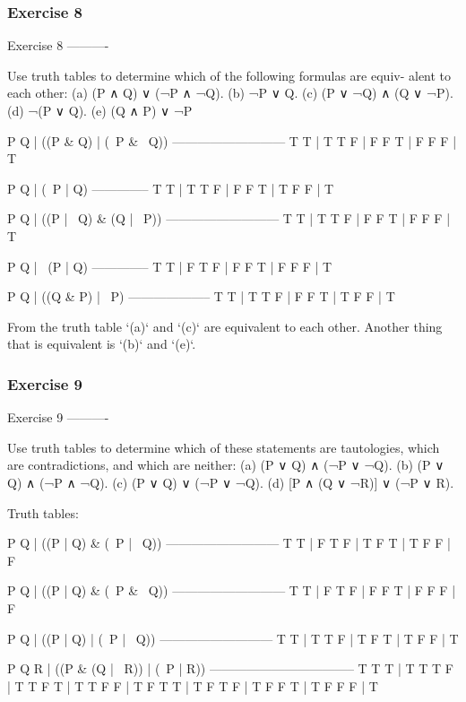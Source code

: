 \subsubsection{Exercise 8}
Exercise 8
----------

    Use truth tables to determine which of the following formulas are equiv-
    alent to each other:
    (a) (P ∧ Q) ∨ (¬P ∧ ¬Q).
    (b) ¬P ∨ Q.
    (c) (P ∨ ¬Q) ∧ (Q ∨ ¬P).
    (d) ¬(P ∨ Q).
    (e) (Q ∧ P) ∨ ¬P

    P Q | ((P & Q) | (~P & ~Q))
    ---------------------------
    T T | T
    T F | F
    F T | F
    F F | T

    P Q | (~P | Q)
    --------------
    T T | T
    T F | F
    F T | T
    F F | T

    P Q | ((P | ~Q) & (Q | ~P))
    ---------------------------
    T T | T
    T F | F
    F T | F
    F F | T

    P Q | ~(P | Q)
    --------------
    T T | F
    T F | F
    F T | F
    F F | T

    P Q | ((Q & P) | ~P)
    --------------------
    T T | T
    T F | F
    F T | T
    F F | T

From the truth table `(a)` and `(c)` are equivalent to each other.
Another thing that is equivalent is `(b)` and `(e)`.

\subsubsection{Exercise 9}
Exercise 9
----------

    Use truth tables to determine which of these statements are tautologies,
    which are contradictions, and which are neither:
    (a) (P ∨ Q) ∧ (¬P ∨ ¬Q).
    (b) (P ∨ Q) ∧ (¬P ∧ ¬Q).
    (c) (P ∨ Q) ∨ (¬P ∨ ¬Q).
    (d) [P ∧ (Q ∨ ¬R)] ∨ (¬P ∨ R).

Truth tables:

    P Q | ((P | Q) & (~P | ~Q))
    ---------------------------
    T T | F
    T F | T
    F T | T
    F F | F

    P Q | ((P | Q) & (~P & ~Q))
    ---------------------------
    T T | F
    T F | F
    F T | F
    F F | F

    P Q | ((P | Q) | (~P | ~Q))
    ---------------------------
    T T | T
    T F | T
    F T | T
    F F | T

    P Q R | ((P & (Q | ~R)) | (~P | R))
    -----------------------------------
    T T T | T
    T T F | T
    T F T | T
    T F F | T
    F T T | T
    F T F | T
    F F T | T
    F F F | T

